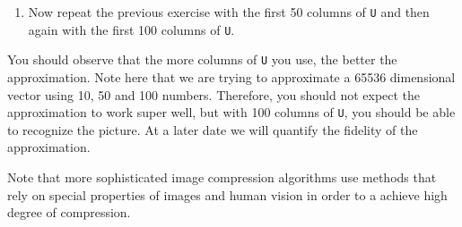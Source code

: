 \begin{prob}
\begin{enumerate}
\begin{enumerate}
\item Now repeat the previous exercise with the first 50 columns of \texttt{U} and then again with the first 100 columns of \texttt{U}. 

\end{enumerate}

You should observe that the more columns of \texttt{U} you use, the better the approximation. Note here that we are trying to approximate a 65536 dimensional vector using 10, 50 and 100 numbers. Therefore, you should not expect the approximation to work super well, but with 100 columns of \texttt{U}, you should be able to recognize the picture. At a later date we will quantify the fidelity of the approximation.

Note that more sophisticated image compression algorithms use methods that rely on special properties of images and human vision in order to a achieve high degree of compression.

\end{enumerate}
\end{prob}
